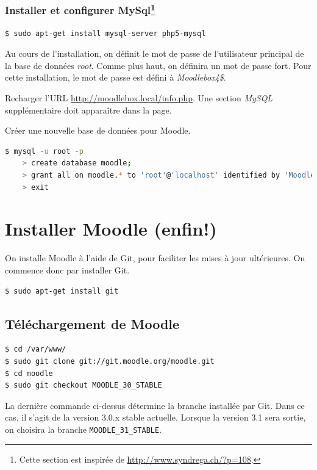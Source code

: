 \documentclass[11pt]{article}
\begin{document}
\subsubsection[Installer et configurer MySql]{Installer et configurer MySql\footnote{Cette section est inspirée de \url{http://www.syndrega.ch/?p=108}.}}

\begin{lstlisting}[language=bash]
$ sudo apt-get install mysql-server php5-mysql
\end{lstlisting}

Au cours de l'installation, on définit le mot de passe de l'utilisateur principal de la base de données \emph{root}. Comme plus haut,  on définira un mot de passe fort. Pour cette installation, le mot de passe est défini à \emph{Moodlebox4\$}.

\begin{verification}
Recharger l'URL \url{http://moodlebox.local/info.php}. Une section \emph{MySQL} supplémentaire doit apparaître dans la page.
\end{verification}

Créer une nouvelle base de données pour Moodle.

\begin{lstlisting}[language=bash]
$ mysql -u root -p
    > create database moodle;
    > grant all on moodle.* to 'root'@'localhost' identified by 'Moodlebox4$';
    > exit
\end{lstlisting}

\section{Installer Moodle (enfin!)}

On installe Moodle à l'aide de Git, pour faciliter les mises à jour ultérieures. On commence donc par installer Git.

\begin{lstlisting}[language=bash]
$ sudo apt-get install git
\end{lstlisting}

\subsection{Téléchargement de Moodle}

\begin{lstlisting}[language=bash]
$ cd /var/www/
$ sudo git clone git://git.moodle.org/moodle.git
$ cd moodle
$ sudo git checkout MOODLE_30_STABLE
\end{lstlisting}
La dernière commande ci-dessus détermine la branche installée par Git. Dans ce cas, il s'agit de la version 3.0.x stable actuelle. Lorsque la version 3.1 sera sortie, on choisira la branche \lstinline{MOODLE_31_STABLE}.
\end{document}
